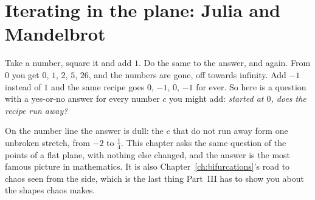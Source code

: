 
\chapter{Iterating in the plane: Julia and Mandelbrot}
\label{ch:mandelbrot}

\noindent
Take a number, square it and add $1$. Do the same to the answer, and again.
From $0$ you get $0$, $1$, $2$, $5$, $26$, and the numbers are gone, off
towards infinity. Add $-1$ instead of $1$ and the same recipe goes $0$,
$-1$, $0$, $-1$ for ever. So here is a question with a yes-or-no answer for
every number $c$ you might add: \emph{started at $0$, does the recipe run
away?}

On the number line the answer is dull: the $c$ that do not run away form
one unbroken stretch, from $-2$ to $\tfrac14$. This chapter asks the same
question of the points of a flat plane, with nothing else changed, and the
answer is the most famous picture in mathematics. It is also
Chapter~\ref{ch:bifurcations}'s road to chaos seen from the side, which is
the last thing Part~III has to show you about the shapes chaos makes.

\begin{outcomes}
\end{outcomes}


